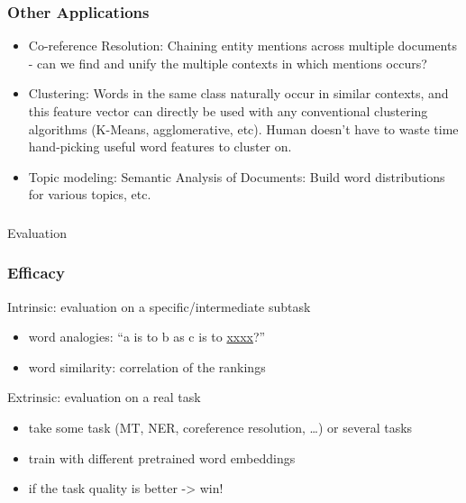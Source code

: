 \begin{frame}[fragile]\frametitle{Other Applications}
\begin{itemize}
\item Co-reference Resolution: Chaining entity mentions across multiple documents  - can we find and unify the multiple contexts in which mentions occurs?
\item Clustering: Words in the same class naturally occur in similar contexts,  and this feature vector can directly be used with any conventional clustering algorithms (K-Means, agglomerative, etc). Human doesn't have to waste time hand-picking useful word features to cluster on.
\item Topic modeling: Semantic Analysis of Documents: Build word distributions for various topics, etc.

\end{itemize}
\end{frame}

\begin{frame}[fragile]\frametitle{}

\begin{center}
{\Large Evaluation}
\end{center}
\end{frame}


\begin{frame}[fragile]\frametitle{Efficacy}
Intrinsic: evaluation on a specific/intermediate subtask
\begin{itemize}
\item  word analogies: “a is to b as c is to \underline{xxxx}?” 
\item  word similarity: correlation of the rankings
\end{itemize}
Extrinsic: evaluation on a real task
\begin{itemize}
\item  take some task (MT, NER, coreference resolution, …) or several tasks
\item   train with different pretrained word embeddings
\item  if the task quality is better -> win!
\end{itemize}
\end{frame}


